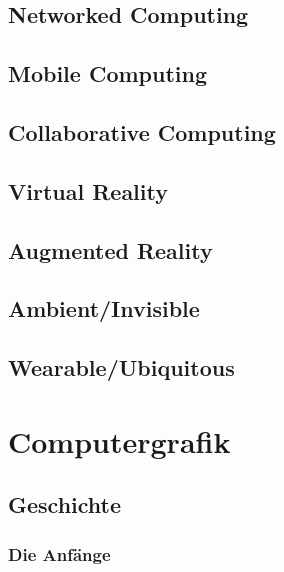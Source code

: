 \documentclass[a4paper, 11pt, accentcolor = tud3b]{tudreport}
\begin{document}
			\subsection{Networked Computing} %

			\subsection{Mobile Computing} %

			\subsection{Collaborative Computing} %

			\subsection{Virtual Reality} %

			\subsection{Augmented Reality} %

			\subsection{Ambient/Invisible} %

			\subsection{Wearable/Ubiquitous} %

		\section{Computergrafik} %

			\subsection{Geschichte} %

				\subsubsection{Die Anfänge} %
\end{document}
